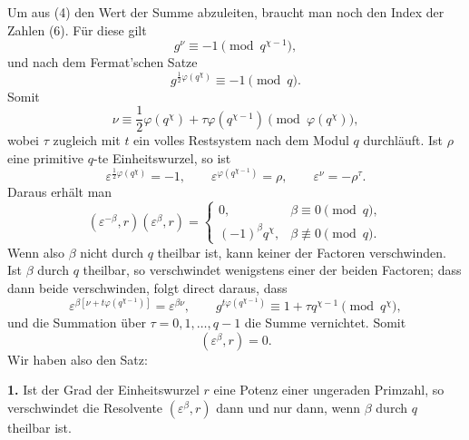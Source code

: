 \documentclass[11pt]{article}
\begin{document}
Um aus (4) den Wert der Summe abzuleiten, braucht man noch den Index der Zahlen (6). Für diese gilt
\[
 g^\nu\equiv -1\pmod {q^{\chi-1}},
\]
und nach dem Fermat'schen Satze
\begin{equation}
 g^{\frac12\varphi(q^\chi)}\equiv -1\pmod q.
\tag{10}
\end{equation}
Somit
\begin{equation}
 \nu\equiv \frac12\varphi(q^\chi)+\tau\varphi(q^{\chi-1})\pmod {\varphi(q^\chi)},
\tag{11}
\end{equation}
wobei $\tau$ zugleich mit $t$ ein volles Restsystem nach dem Modul $q$ durchläuft. Ist $\rho$ eine primitive $q$-te Einheitswurzel, so ist
\[
 \varepsilon^{\frac12\varphi(q^\chi)}=-1,
 \qquad
 \varepsilon^{\varphi(q^{\chi-1})}=\rho,
 \qquad
 \varepsilon^\nu=-\rho^\tau.
\]
Daraus erhält man
\begin{equation}
 (\varepsilon^{-\beta},r)(\varepsilon^\beta,r)=
 \begin{cases}
 0,&\beta\equiv0\pmod q,\\
 (-1)^\beta q^\chi,&\beta\not\equiv0\pmod q.
 \end{cases}
\tag{12}
\end{equation}
Wenn also $\beta$ nicht durch $q$ theilbar ist, kann keiner der Factoren verschwinden. Ist $\beta$ durch $q$ theilbar, so verschwindet wenigstens einer der beiden Factoren; dass dann beide verschwinden, folgt direct daraus, dass
\[
 \varepsilon^{\beta[\nu+t\varphi(q^{\chi-1})]}=\varepsilon^{\beta\nu},
 \qquad
 g^{t\varphi(q^{\chi-1})}\equiv1+\tau q^{\chi-1}\pmod {q^\chi},
\]
und die Summation über $\tau=0,
1,
\ldots,q-1$ die Summe vernichtet. Somit
\begin{equation}
 (\varepsilon^\beta,r)=0.
\tag{13}
\end{equation}
Wir haben also den Satz:

\medskip
\noindent\textbf{1.} Ist der Grad der Einheitswurzel $r$ eine Potenz einer ungeraden Primzahl, so verschwindet die Resolvente $(\varepsilon^\beta,r)$ dann und nur dann, wenn $\beta$ durch $q$ theilbar ist.
\end{document}
